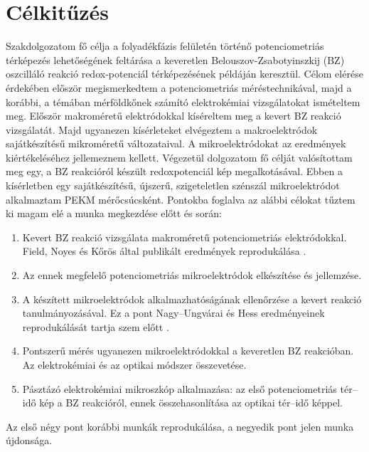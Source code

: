 \chapter{Célkitűzés} \label{celkituzes}
\pagestyle{headings}

Szakdolgozatom fő célja a folyadékfázis felületén történő potenciometriás térképezés lehetőségének feltárása a keveretlen Belouszov-Zsabotyinszkij (BZ) oszcilláló reakció redox-potenciál térképezésének példáján keresztül. Célom elérése érdekében először megismerkedtem a potenciometriás méréstechnikával, majd a korábbi, a témában mérföldkőnek számító elektrokémiai vizsgálatokat ismételtem meg. Először makroméretű elektródokkal kíséreltem meg a kevert BZ reakció vizsgálatát. Majd ugyanezen kísérleteket elvégeztem a makroelektródok sajátkészítésű mikroméretű változataival. A mikroelektródokat az eredmények kiértékeléséhez jellemeznem kellett. Végezetül dolgozatom fő célját valósítottam meg egy, a BZ reakcióról készült redoxpotenciál kép megalkotásával. Ebben a kísérletben egy sajátkészítésű, újszerű, szigeteletlen szénszál mikroelektródot alkalmaztam PEKM mérőcsúcsként. Pontokba foglalva az alábbi célokat tűztem ki magam elé a munka megkezdése előtt és során:

\begin{enumerate}
\item Kevert BZ reakció vizsgálata makroméretű potenciometriás elektródokkal. Field, Noyes és Kőrös által publikált eredmények reprodukálása \cite{noyes1972oscillations}. 
\item Az ennek megfelelő potenciometriás mikroelektródok elkészítése és jellemzése.
\item A készített mikroelektródok alkalmazhatóságának ellenőrzése a kevert reakció tanulmányozásával. Ez a pont Nagy--Ungvárai és Hess eredményeinek reprodukálását tartja szem előtt \cite{nagy1991control}. 
\item Pontszerű mérés ugyanezen mikroelektródokkal a keveretlen BZ reakcióban. Az elektrokémiai és az optikai módszer összevetése.
\item Pásztázó elektrokémiai mikroszkóp alkalmazása: az első potenciometriás tér--idő kép a BZ reakcióról, ennek összehasonlítása az optikai tér--idő képpel.
\end{enumerate}

Az első négy pont korábbi munkák reprodukálása, a negyedik pont jelen munka újdonsága. 

